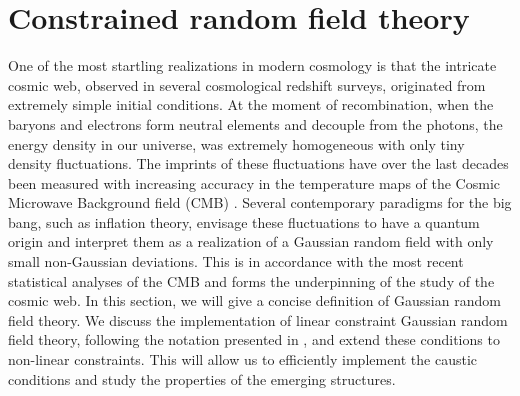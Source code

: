 \documentclass[a4paper, 11pt]{article}
\begin{document}
\section{Constrained random field theory}\label{sec:GRF}
One of the most startling realizations in modern cosmology is that the intricate cosmic web, observed in several cosmological redshift surveys, originated from extremely simple initial conditions. At the moment of recombination, when the baryons and electrons form neutral elements and decouple from the photons, the energy density in our universe, was extremely homogeneous with only tiny density fluctuations. The imprints of these fluctuations have over the last decades been measured with increasing accuracy in the temperature maps of the Cosmic Microwave Background field (CMB) \cite{WMAP:2003, Planck:2016}. Several contemporary paradigms for the big bang, such as inflation theory, envisage these fluctuations to have a quantum origin and interpret them as a realization of a Gaussian random field with only small non-Gaussian deviations. This is in accordance with the most recent statistical analyses of the CMB \cite {Creminelli:2006, Planck:2020} and forms the underpinning of the study of the cosmic web. In this section, we will give a concise definition of Gaussian random field theory. We discuss the implementation of linear constraint Gaussian random field theory, following the notation presented in \cite{Weygaert:1996}, and extend these conditions to non-linear constraints. This will allow us to efficiently implement the caustic conditions and study the properties of the emerging structures.

\end{document}
